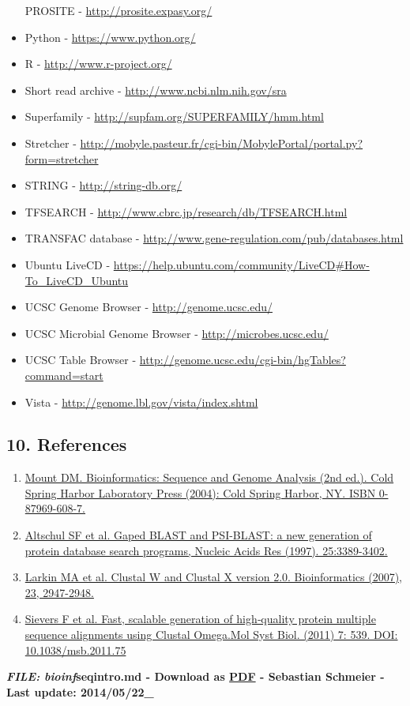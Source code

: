 \documentclass[]{article}
\begin{document}
\begin{itemize}
  PROSITE - \url{http://prosite.expasy.org/}
\item
  Python - \url{https://www.python.org/}
\item
  R - \url{http://www.r-project.org/}
\item
  Short read archive - \url{http://www.ncbi.nlm.nih.gov/sra}
\item
  Superfamily - \url{http://supfam.org/SUPERFAMILY/hmm.html}
\item
  Stretcher -
  \url{http://mobyle.pasteur.fr/cgi-bin/MobylePortal/portal.py?form=stretcher}
\item
  STRING - \url{http://string-db.org/}
\item
  TFSEARCH - \url{http://www.cbrc.jp/research/db/TFSEARCH.html}
\item
  TRANSFAC database -
  \url{http://www.gene-regulation.com/pub/databases.html}
\item
  Ubuntu LiveCD -
  \url{https://help.ubuntu.com/community/LiveCD\#How-To_LiveCD_Ubuntu}
\item
  UCSC Genome Browser - \url{http://genome.ucsc.edu/}
\item
  UCSC Microbial Genome Browser - \url{http://microbes.ucsc.edu/}
\item
  UCSC Table Browser -
  \url{http://genome.ucsc.edu/cgi-bin/hgTables?command=start}
\item
  Vista - \url{http://genome.lbl.gov/vista/index.shtml}
\end{itemize}

\subsection{10. References}\label{references}

\begin{enumerate}
\def\labelenumi{\arabic{enumi}.}
\itemsep1pt\parskip0pt
\item
  \href{http://www.cshlpress.com/default.tpl?cart=14004538673655488\&fromlink=T\&linkaction=full\&linksortby=oop_title\&--eqSKUdatarq=466}{Mount
  DM. Bioinformatics: Sequence and Genome Analysis (2nd ed.). Cold
  Spring Harbor Laboratory Press (2004): Cold Spring Harbor, NY. ISBN
  0-87969-608-7.}
\item
  \href{http://www.ncbi.nlm.nih.gov/pubmed/?term=9254694}{Altschul SF et
  al. Gaped BLAST and PSI-BLAST: a new generation of protein database
  search programs, Nucleic Acids Res (1997). 25:3389-3402.}
\item
  \href{http://www.ncbi.nlm.nih.gov/pubmed/17846036}{Larkin MA et al.
  Clustal W and Clustal X version 2.0. Bioinformatics (2007), 23,
  2947-2948.}
\item
  \href{http://msb.embopress.org/content/7/1/539}{Sievers F et al. Fast,
  scalable generation of high‐quality protein multiple sequence
  alignments using Clustal Omega.Mol Syst Biol. (2011) 7: 539. DOI:
  10.1038/msb.2011.75}
\end{enumerate}

\textbf{\emph{FILE: bioinf}seqintro.md - Download as
\href{http://compbio.massey.ac.nz/wiki/data/c1/doc/c1_seqintro.pdf}{PDF}
- Sebastian Schmeier - Last update: 2014/05/22\_}
\end{document}
